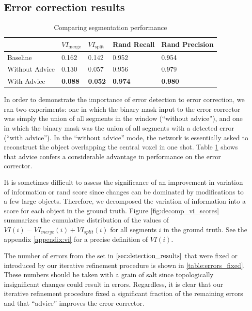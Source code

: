 \documentclass{article}
\begin{document}
\subsection{Error correction results}
\begin{table}[h]
  \caption{Comparing segmentation performance}
  \label{table:vi_scores}
  \centering
  \begin{tabular}{lllll}
    \toprule
	& $VI_\text{merge}$ & $VI_\text{split}$ & Rand Recall & Rand Precision\\
    \midrule
    Baseline & 0.162 & 0.142 & 0.952 & 0.954\\
    Without Advice & 0.130 & 0.057 & 0.956 & 0.979\\
	With Advice & \textbf{0.088} & \textbf{0.052} & \textbf{0.974} & \textbf{0.980}\\
    \bottomrule
  \end{tabular}
\end{table}

In order to demonstrate the importance of error detection to error correction, we ran two experiments: one in which the binary mask input to the error corrector was simply the union of all segments in the window (``without advice''), and one in which the binary mask was the union of all segments with a detected error (``with advice''). In the ``without advice'' mode, the network is essentially asked to reconstruct the object overlapping the central voxel in one shot. Table \ref{table:vi_scores} shows that advice confers a considerable advantage in performance on the error corrector.

It is sometimes difficult to assess the significance of an improvement in variation of information or rand score since changes can be dominated by modifications to a few large objects. Therefore, we decomposed the variation of information into a score for each object in the ground truth. Figure \ref{fig:decomp_vi_scores} summarizes the cumulative distribution of the values of $VI(i)=VI_{merge}(i)+VI_{split}(i)$ for all segments $i$ in the ground truth. See the appendix \ref{appendix:vi} for a precise definition of $VI(i)$.

The number of errors from the set in $\ref{sec:detection_results}$ that were fixed or introduced by our iterative refinement procedure is shown in \ref{table:errors_fixed}. These numbers should be taken with a grain of salt since topologically insignificant changes could result in errors. Regardless, it is clear that our iterative refinement procedure fixed a significant fraction of the remaining errors and that ``advice'' improves the error corrector.
\end{document}
